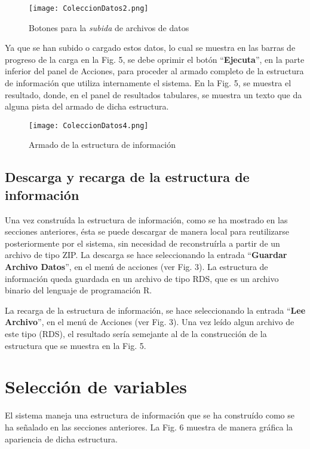\documentclass[spanish,]{article}
\begin{document}
\begin{figure}
\centering
\texttt{[image: ColeccionDatos2.png]}
\caption{Botones para la \emph{subida} de archivos de datos}
\end{figure}

Ya que se han subido o cargado estos datos, lo cual se muestra en las
barras de progreso de la carga en la Fig. 5, se debe oprimir el botón
``\textbf{Ejecuta}'', en la parte inferior del panel de Acciones, para
proceder al armado completo de la estructura de información que utiliza
internamente el sistema. En la Fig. 5, se muestra el resultado, donde,
en el panel de resultados tabulares, se muestra un texto que da alguna
pista del armado de dicha estructura.

\begin{figure}
\centering
\texttt{[image: ColeccionDatos4.png]}
\caption{Armado de la estructura de información}
\end{figure}

\subsection{Descarga y recarga de la estructura de
información}\label{descarga-y-recarga-de-la-estructura-de-informacion}

Una vez construída la estructura de información, como se ha mostrado en
las secciones anteriores, ésta se puede descargar de manera local para
reutilizarse posteriormente por el sistema, sin necesidad de
reconstruírla a partir de un archivo de tipo ZIP. La descarga se hace
seleccionando la entrada ``\textbf{Guardar Archivo Datos}'', en el menú
de acciones (ver Fig. 3). La estructura de información queda guardada en
un archivo de tipo RDS, que es un archivo binario del lenguaje de
programación R.

La recarga de la estructura de información, se hace seleccionando la
entrada ``\textbf{Lee Archivo}'', en el menú de Acciones (ver Fig. 3).
Una vez leído algun archivo de este tipo (RDS), el resultado sería
semejante al de la construcción de la estructura que se muestra en la
Fig. 5.

\section{Selección de variables}\label{seleccion-de-variables}

El sistema maneja una estructura de información que se ha construído
como se ha señalado en las secciones anteriores. La Fig. 6 muestra de
manera gráfica la apariencia de dicha estructura.
\end{document}
